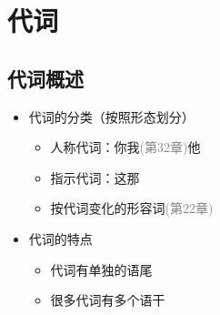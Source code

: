 \documentclass[17pt]{beamer}
\newcommand{\notsoimportant}[1]{\textcolor{gray}{#1}}
\begin{document}
\section{代词}
\begin{frame}{\insertsection }
    \tableofcontents[currentsection]
\end{frame}

\subsection{代词概述}
\begin{frame}{\insertsubsection}
  \begin{itemize}
    \item 代词的分类（按照形态划分）
    \begin{itemize}
      \item 人称代词：你我\notsoimportant{(第32章)}他
      \item 指示代词：这那
      \item 按代词变化的形容词\notsoimportant{(第22章)}
    \end{itemize}
    \bigskip
    
    \item 代词的特点
    \begin{itemize}
      \item 代词有单独的语尾
      \item 很多代词有多个语干
    \end{itemize}
  \end{itemize}
  
\end{frame}
\end{document}
